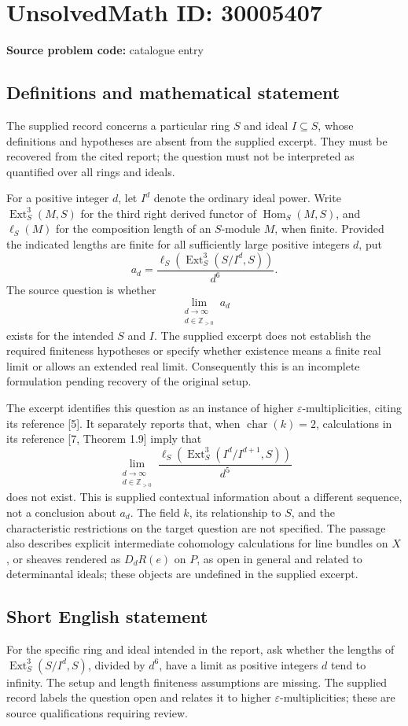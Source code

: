 \documentclass[11pt]{article}
\newcommand{\Z}{\mathbb{Z}}
\begin{document}
\section*{UnsolvedMath ID: 30005407}
\textbf{Source problem code:} catalogue entry
\subsection{Definitions and mathematical statement}
The supplied record concerns a particular ring \(S\) and ideal \(I\subseteq S\), whose definitions and hypotheses are absent from the supplied excerpt. They must be recovered from the cited report; the question must not be interpreted as quantified over all rings and ideals.

For a positive integer \(d\), let \(I^d\) denote the ordinary ideal power. Write \(\operatorname{Ext}^3_S(M,S)\) for the third right derived functor of \(\operatorname{Hom}_S(M,S)\), and \(\ell_S(M)\) for the composition length of an \(S\)-module \(M\), when finite. Provided the indicated lengths are finite for all sufficiently large positive integers \(d\), put
\[
 a_d=\frac{\ell_S\!\left(\operatorname{Ext}^3_S(S/I^d,S)\right)}{d^6}.
\]
The source question is whether
\[
 \lim_{\substack{d\to\infty\\ d\in\Z_{>0}}}a_d
\]
exists for the intended \(S\) and \(I\). The supplied excerpt does not establish the required finiteness hypotheses or specify whether existence means a finite real limit or allows an extended real limit. Consequently this is an incomplete formulation pending recovery of the original setup.

The excerpt identifies this question as an instance of higher \(\varepsilon\)-multiplicities, citing its reference [5]. It separately reports that, when \(\operatorname{char}(k)=2\), calculations in its reference [7, Theorem 1.9] imply that
\[
 \lim_{\substack{d\to\infty\\ d\in\Z_{>0}}}
 \frac{\ell_S\!\left(\operatorname{Ext}^3_S(I^d/I^{d+1},S)\right)}{d^5}
\]
does not exist. This is supplied contextual information about a different sequence, not a conclusion about \(a_d\). The field \(k\), its relationship to \(S\), and the characteristic restrictions on the target question are not specified. The passage also describes explicit intermediate cohomology calculations for line bundles on \(X\), or sheaves rendered as \(D_dR(e)\) on \(P\), as open in general and related to determinantal ideals; these objects are undefined in the supplied excerpt.
\subsection{Short English statement}
For the specific ring and ideal intended in the report, ask whether the lengths of \(\operatorname{Ext}^3_S(S/I^d,S)\), divided by \(d^6\), have a limit as positive integers \(d\) tend to infinity. The setup and length finiteness assumptions are missing. The supplied record labels the question open and relates it to higher \(\varepsilon\)-multiplicities; these are source qualifications requiring review.
\end{document}
